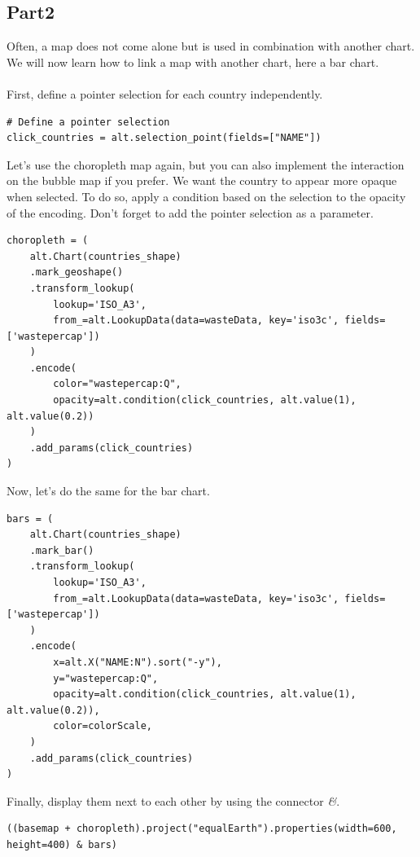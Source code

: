\documentclass[11pt]{article}
\begin{document}
\subsection*{Part2}

Often, a map does not come alone but is used in combination with another chart. We will now learn how to link a map with another chart, here a bar chart.\\
\\
First, define a pointer selection for each country independently.

\begin{verbatim}
# Define a pointer selection
click_countries = alt.selection_point(fields=["NAME"])
\end{verbatim}

Let's use the choropleth map again, but you can also implement the interaction on the bubble map if you prefer. We want the country to appear more opaque when selected. To do so, apply a condition based on the selection to the opacity of the encoding. Don't forget to add the pointer selection as a parameter.

\begin{verbatim}
choropleth = (
    alt.Chart(countries_shape)
    .mark_geoshape()
    .transform_lookup(
        lookup='ISO_A3',
        from_=alt.LookupData(data=wasteData, key='iso3c', fields=['wastepercap'])
    )
    .encode(
        color="wastepercap:Q",
        opacity=alt.condition(click_countries, alt.value(1), alt.value(0.2))
    )
    .add_params(click_countries)
)
\end{verbatim}

Now, let's do the same for the bar chart.

\begin{verbatim}
bars = (
    alt.Chart(countries_shape)
    .mark_bar()
    .transform_lookup(
        lookup='ISO_A3',
        from_=alt.LookupData(data=wasteData, key='iso3c', fields=['wastepercap'])
    )
    .encode(
        x=alt.X("NAME:N").sort("-y"),
        y="wastepercap:Q",
        opacity=alt.condition(click_countries, alt.value(1), alt.value(0.2)),
        color=colorScale,
    )
    .add_params(click_countries)
)
\end{verbatim}

Finally, display them next to each other by using the connector \textit{\&}.

\begin{verbatim}
((basemap + choropleth).project("equalEarth").properties(width=600, height=400) & bars)
\end{verbatim}
\end{document}
